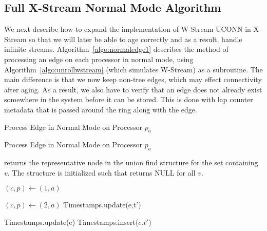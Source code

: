 \subsection{Full X-Stream Normal Mode Algorithm}\label{sec:algo:normal}
We next describe how to expand the implementation of W-Stream UCONN in X-Stream so that we will later be able to age correctly and as a result, handle infinite streams. Algorithm~\ref{algo:normaledge1} describes the method of processing an edge on each processor in normal mode, using Algorithm~\ref{algo:unrollwstream} (which simulates W-Stream) as a subroutine. The main difference is that we now keep non-tree edges, which may effect connectivity after aging. As a result, we also have to verify that an edge does not already exist somewhere in the system before it can be stored. This is done with lap counter metadata that is passed around the ring along with the edge.
\begin{algorithm*}
\caption{Process Edge in Normal Mode on Processor $p_a$}\label{algo:normaledge1}
Process Edge in Normal Mode on Processor $p_a$\\\makealgtitle
\begin{algorithmic}[1]
\LeftComment  {} returns the representative node in the union find structure for the set containing $v$. The structure is initialized such that  returns NULL for all $v$.

	\State  \Return
	\Else
	  	\State $(c,p) \gets (1,a)$ 
		  \State {}
 		 \State \Return
	\EndIf
\EndIf
{}
 \State {} 
\EndIf

   $(c,p) \gets (2,a)$ 
  \Else
      Timestamps.update(e,t')
    \Else \   
    \EndIf
    \State  \Return
  \EndIf
\EndIf
{}
\State {}

\EndProcedure

  \State Timestamps.update(e)
  \State \Return
\EndIf
{}  
  \State Timestamps.insert($e$,$t'$)  
  \State \Return
\Else 
  \State {}
\EndIf
\EndProcedure

\end{algorithmic}
\end{algorithm*}














